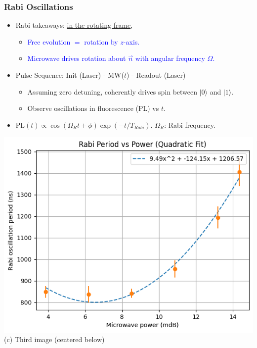 \begin{frame}
\frametitle{Rabi Oscillations}
\begin{itemize}
    \item Rabi takeaways: \underline{in the rotating frame}, 
    \begin{itemize}
        \item \textcolor{blue}{Free evolution $=$ rotation by $z$-axis.} 
        \item \textcolor{blue}{Microwave drives rotation about $\vec{n}$ with angular frequency $\Omega$.} 
    \end{itemize}
    \item Pulse Sequence: Init (Laser) - MW($t$) - Readout (Laser)
    \begin{itemize}
        \item Assuming zero detuning, coherently drives spin between $|0\rangle$ and $|1\rangle$. 
        \item Observe oscillations in fluorescence (PL) vs $t$.
    \end{itemize}
    \item PL$(t) \propto \cos(\Omega_R t + \phi) \exp(-t/T_{Rabi})$. $\Omega_R$: Rabi frequency.
\end{itemize}
\begin{minipage}{0.5\textwidth}
    \centering
    \includegraphics[width=\linewidth]{presentation/figs/period_vs_power.png} \\
    {\small (c) Third image (centered below)}
\end{minipage}

\end{frame}

